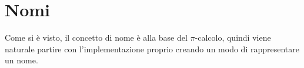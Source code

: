 \section{Nomi}

Come si \`e visto, il concetto di nome \`e alla base del $\pi$-calcolo,
quindi viene naturale partire con l'implementazione proprio creando un
modo di rappresentare un nome.




